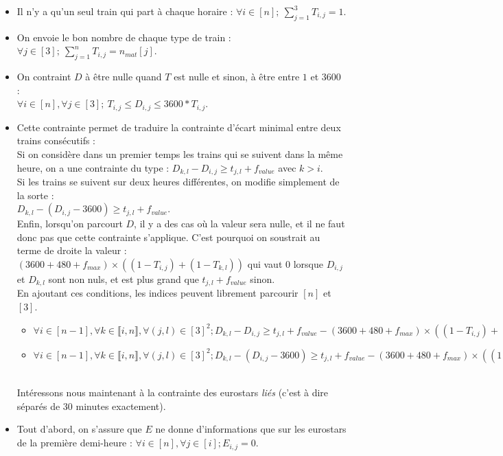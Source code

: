 \documentclass{rapport}
\begin{document}
\begin{itemize}
	\item Il n'y a qu'un seul train qui part à chaque horaire : $\forall i \in [n]; \ \sum_{j = 1}^3 T_{i, j} = 1$.
	\item On envoie le bon nombre de chaque type de train : $\forall j \in [3]; \ \sum_{j = 1}^n T_{i, j} = n_{mat}[j]$.
	\item On contraint $D$ à être nulle quand $T$ est nulle et sinon, à être entre $1$ et $3600$ : \\ $\forall i \in [n], \forall j \in [3]; \ T_{i, j} \le D_{i, j} \le 3600 * T_{i, j}$.
	\item Cette contrainte permet de traduire la contrainte d'écart minimal entre deux trains consécutifs : \\
	Si on considère dans un premier temps les trains qui se suivent dans la même heure, on a une contrainte du type : $D_{k, l} - D_{i, j} \ge t_{j, l} + f_{value}$ avec $k>i$.\\ Si les trains se suivent sur deux heures différentes, on modifie simplement de la sorte : \\ $D_{k, l} - (D_{i, j} - 3600) \ge t_{j, l} + f_{value}$. \\Enfin, lorsqu'on parcourt $D$, il y a des cas où la valeur sera nulle, et il ne faut donc pas que cette contrainte s'applique. C'est pourquoi on soustrait au terme de droite la valeur : $(3600 + 480 + f_{max}) \times ((1 - T_{i, j}) + (1 - T_{k, l}))$ qui vaut 0 lorsque $D_{i, j}$ et $D_{k, l}$ sont non nuls, et est plus grand que $t_{j, l} + f_{value}$ sinon. \\
    En ajoutant ces conditions, les indices peuvent librement parcourir $[n]$ et $[3]$.
	\begin{itemize}
		\item $\forall i \in [n-1], \forall k \in \llbracket i, n \rrbracket, \forall (j, l) \in [3]^2; D_{k, l} - D_{i, j} \ge t_{j, l} + f_{value} - (3600 + 480 + f_{max}) \times ((1 - T_{i, j}) + (1 - T_{k, l}))$
		\item $\forall i \in [n-1], \forall k \in \llbracket i, n \rrbracket, \forall (j, l) \in [3]^2; D_{k, l} - (D_{i, j} - 3600) \ge t_{j, l} + f_{value} - (3600 + 480 + f_{max}) \times ((1 - T_{i, j}) + (1 - T_{k, l}))$
	\end{itemize}
    \ \\
    Intéressons nous maintenant à la contrainte des eurostars \emph{liés} (c'est à dire séparés de 30 minutes exactement).
	\item Tout d'abord, on s'assure que $E$ ne donne d'informations que sur les eurostars de la première demi-heure : $\forall i \in [n], \forall j \in [i]; E_{i, j} = 0$.

\end{itemize}
\end{document}
